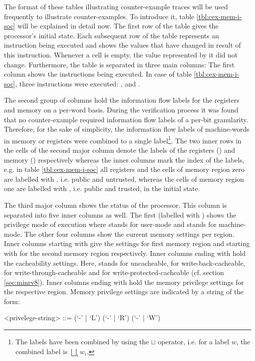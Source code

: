 \begin{example}
    The format of these tables illustrating counter-example traces will be used frequently to illustrate counter-examples.
    To introduce it, table \ref{tbl:cex-mem-i-soc} will be explained in detail now.
    The first row of the table gives the processor's initial state.
    Each subsequent row of the table represents an instruction being executed and shows the values that have changed in result of this instruction.
    Whenever a cell is empty, the value represented by it did not change.
    Furthermore, the table is separated in three main columns: The first column shows the instructions being executed.
    In case of table \ref{tbl:cex-mem-i-soc}, three instructions were executed: ,  and .

    The second group of columns hold the information flow labels for the registers and memory on a per-word basis.
    During the verification process it was found that no counter-example required information flow labels of a per-bit granularity.
    Therefore, for the sake of simplicity, the information flow labels of machine-words in memory or registers were combined to a single label\footnote{
        The labels have been combined by using the $ \sqcup $ operator, i.e. for a label $ w $, the combined label is $ \bigsqcup_{i} w_i $.
    }.
    The two inner rows in the cells of the second major column denote the labels of the registers () and memory () respectively whereas the inner columns mark the index of the labels, e.g. in table \ref{tbl:cex-mem-i-soc} all registers and the cells of memory region zero are labelled with \PU{}, i.e. public and untrusted, whereas the cells of memory region one are labelled with \PT{}, i.e. public and trusted, in the initial state.

    The third major column shows the status of the processor.
    This column is separated into five inner columns as well.
    The first (labelled with ) shows the privilege mode of execution where  stands for user-mode and  stands for machine-mode.
    The other four columns show the current memory settings per region.
    Inner columns starting with  give the settings for first memory region and starting with  for the second memory region respectively.
    Inner columns ending with  hold the cacheability settings.
    Here,  stands for uncacheable,  for write-back-cacheable,  for write-through-cacheable and  for write-protected-cacheable (cf. section \ref{sec:minrv8}).
    Inner columns ending with  hold the memory privilege settings for the respective region.
    Memory privilege settings are indicated by a string of the form:
    \begin{grammar}
        <privelege-string> ::= (`-' | `L') (`-' | `R') (`-' | `W')
    \end{grammar}


\end{example}
